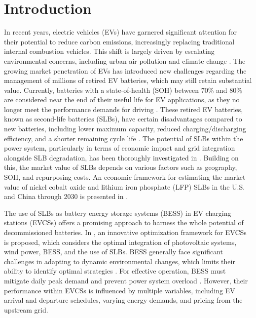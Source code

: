\documentclass[10pt, journal]{IEEEtran}
\begin{document}
\section{Introduction}
In recent years, electric vehicles (EVs) have garnered significant attention for their potential to reduce carbon emissions, increasingly replacing traditional internal combustion vehicles. This shift is largely driven by escalating environmental concerns, including urban air pollution and climate change \cite{li2022comprehensive}. The growing market penetration of EVs has introduced new challenges regarding the management of millions of retired EV batteries, which may still retain substantial value. Currently, batteries with a state-of-health (SOH) between 70\% and 80\% are considered near the end of their useful life for EV applications, as they no longer meet the performance demands for driving \cite{hossain2019comprehensive}. These retired EV batteries, known as second-life batteries (SLBs), have certain disadvantages compared to new batteries, including lower maximum capacity, reduced charging/discharging efficiency, and a shorter remaining cycle life \cite{yang2021flexible}. The potential of SLBs within the power system, particularly in terms of economic impact and grid integration alongside SLB degradation, has been thoroughly investigated in \cite{hassan2023second}. Building on this, the market value of SLBs depends on various factors such as geography, SOH, and repurposing costs. An economic framework for estimating the market value of nickel cobalt oxide and lithium iron phosphate (LFP) SLBs in the U.S. and China through 2030 is presented in \cite{bach2024fair}.

The use of SLBs as battery energy storage systems (BESS) in EV charging stations (EVCSs) offers a promising approach to harness the whole potential of decommissioned batteries. In \cite{lin2023planning}, an innovative optimization framework for EVCSs is proposed, which considers the optimal integration of photovoltaic systems, wind power, BESS, and the use of SLBs. BESS generally face significant challenges in adapting to dynamic environmental changes, which limits their ability to identify optimal strategies \cite{haghighi2023cloud}. For effective operation, BESS must mitigate daily peak demand and prevent power system overload \cite{karimianfard2022economic}. However, their performance within EVCSs is influenced by multiple variables, including EV arrival and departure schedules, varying energy demands, and pricing from the upstream grid.
\vspace{-1mm}
\end{document}
